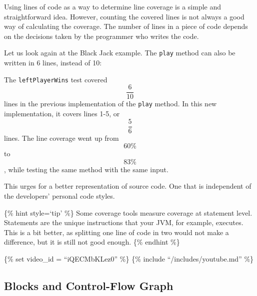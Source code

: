 Using lines of code as a way to determine line coverage is a simple and
straightforward idea. However, counting the covered lines is not always
a good way of calculating the coverage. The number of lines in a piece
of code depends on the decisions taken by the programmer who writes the
code.

Let us look again at the Black Jack example. The \texttt{play} method
can also be written in 6 lines, instead of 10:

\begin{Shaded}
\begin{Highlighting}[]
  \NormalTok{(}
  
  
  \NormalTok{;}
  \NormalTok{;}
  
   
\NormalTok{\}}
\end{Highlighting}
\end{Shaded}

The \texttt{leftPlayerWins} test covered \[\frac{6}{10}\] lines in the
previous implementation of the \texttt{play} method. In this new
implementation, it covers lines 1-5, or \[\frac{5}{6}\] lines. The line
coverage went up from \[60\%\] to \[83\%\], while testing the same
method with the same input.

This urges for a better representation of source code. One that is
independent of the developers' personal code styles.

\{\% hint style=`tip' \%\} Some coverage tools measure coverage at
statement level. Statements are the unique instructions that your JVM,
for example, executes. This is a bit better, as splitting one line of
code in two would not make a difference, but it is still not good
enough. \{\% endhint \%\}

\{\% set video\_id = ``iQECMbKLez0'' \%\} \{\% include
``/includes/youtube.md'' \%\}

\hypertarget{blocks-and-control-flow-graph}{%
\subsection{Blocks and Control-Flow
Graph}\label{blocks-and-control-flow-graph}}

